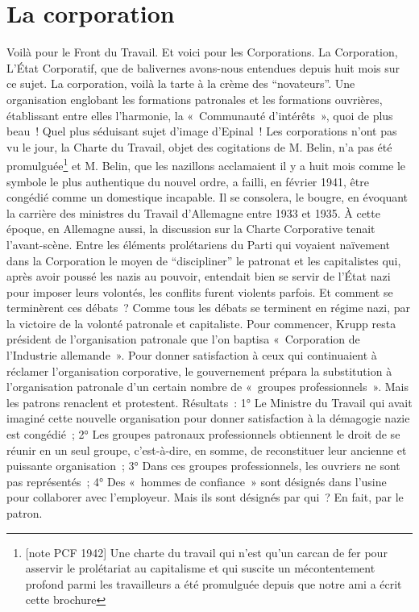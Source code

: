 \documentclass[french,twoside]{book} %
\begin{document}
\section[La corporation]{La corporation}
\noindent Voilà pour le Front du Travail. Et voici pour les Corporations. La Corporation, L’État Corporatif, que de balivernes avons-nous entendues depuis huit mois sur ce sujet. La corporation, voilà la tarte à la crème des “novateurs”. Une organisation englobant les formations patronales et les formations ouvrières, établissant entre elles l’harmonie, la « Communauté d’intérêts », quoi de plus beau ! Quel plus séduisant sujet d’image d’Epinal ! Les corporations n’ont pas vu le jour, la Charte du Travail, objet des cogitations de M. Belin, n’a pas été promulguée\footnote{[note PCF 1942] Une charte du travail qui n’est qu’un carcan de fer pour asservir le prolétariat au capitalisme et qui suscite un mécontentement profond parmi les travailleurs a été promulguée depuis que notre ami a écrit cette brochure} et M. Belin, que les nazillons acclamaient il y a huit mois comme le symbole le plus authentique du nouvel ordre, a failli, en février 1941, être congédié comme un domestique incapable. Il se consolera, le bougre, en évoquant la carrière des ministres du Travail d’Allemagne entre 1933 et 1935. À cette époque, en Allemagne aussi, la discussion sur la Charte Corporative tenait l’avant-scène. Entre les éléments prolétariens du Parti qui voyaient naïvement dans la Corporation le moyen de “discipliner” le patronat et les capitalistes qui, après avoir poussé les nazis au pouvoir, entendait bien se servir de l’État nazi pour imposer leurs volontés, les conflits furent violents parfois. Et comment se terminèrent ces débats ? Comme tous les débats se terminent en régime nazi, par la victoire de la volonté patronale et capitaliste. Pour commencer, Krupp resta président de l’organisation patronale que l’on baptisa « Corporation de l’Industrie allemande ». Pour donner satisfaction à ceux qui continuaient à réclamer l’organisation corporative, le gouvernement prépara la substitution à l’organisation patronale d’un certain nombre de « groupes professionnels ». Mais les patrons renaclent et protestent. Résultats : 1° Le Ministre du Travail qui avait imaginé cette nouvelle organisation pour donner satisfaction à la démagogie nazie est congédié ; 2° Les groupes patronaux professionnels obtiennent le droit de se réunir en un seul groupe, c’est-à-dire, en somme, de reconstituer leur ancienne et puissante organisation ; 3° Dans ces groupes professionnels, les ouvriers ne sont pas représentés ; 4° Des « hommes de confiance » sont désignés dans l’usine pour collaborer avec l’employeur. Mais ils sont désignés par qui ? En fait, par le patron.
\end{document}
